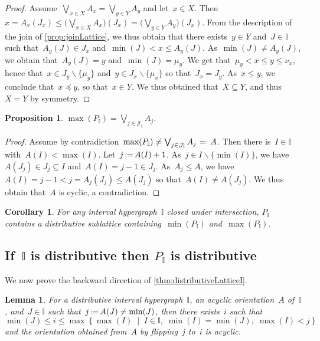 \documentclass[reqno]{amsart}
\newtheorem{corollary}[theorem]{Corollary}
\newtheorem{proposition}[theorem]{Proposition}
\newtheorem{lemma}[theorem]{Lemma}
\theoremstyle{definition}
\newcommand{\cal}[1]{\mathcal{#1}} %
\newcommand{\set}[2]{\left\{ #1 \;\middle|\; #2 \right\}} %
\newcommand{\ssm}{\smallsetminus} %
\newcommand{\eqdef}{\mbox{\,\raisebox{0.2ex}{\scriptsize\ensuremath{\mathrm:}}\ensuremath{=}\,}} %
\newcommand{\defeq}{\mbox{~\ensuremath{=}\raisebox{0.2ex}{\scriptsize\ensuremath{\mathrm:}} }} %
\newcommand{\bigJoin}{\bigvee} %
\newcommand{\II}{\mathbb I} %
\newcommand{\cJ}{\cal{J}} %
\begin{document}
\begin{proof}
Assume~$\bigJoin\limits_{x \in X} A_x = \bigJoin\limits_{y \in Y} A_y$ and let~$x \in X$.
Then $x = A_x(J_x) \le \big( \bigJoin\limits_{x \in X} A_x \big)(J_x) = \big( \bigJoin\limits_{y \in Y} A_y \big)(J_x)$.
From the description of the join of \cref{prop:joinLattice}, we thus obtain that there exists~$y \in Y$ and~$J \in \II$ such that~$A_y(J) \in J_x$ and~$\min(J) < x \le A_y(J)$.
As~$\min(J) \ne A_y(J)$, we obtain that~$A_y(J) = y$ and~$\min(J) = \mu_y$.
We get that~$\mu_y < x \le y \le \nu_x$, hence that~$x \in J_y \ssm \{\mu_y\}$ and~$y \in J_x \ssm \{\mu_x\}$ so that~$J_x = J_y$.
As~$x \le y$, we conclude that~$x \preccurlyeq y$, so that~$x \in Y$.
We thus obtained that~$X \subseteq Y$, and thus~$X = Y$ by symmetry.
\end{proof}

\begin{proposition}
$\displaystyle \max(P_\II) = \bigJoin\limits_{j \in \cJ_\II} A_j$.
\end{proposition}

\begin{proof}
Assume by contradiction~$\max(P_\II) \ne \bigJoin_{j \in \cJ_\II} A_j \defeq A$.
Then there is~$I \in \II$ with~${A(I) < \max(I)}$.
Let~$j \eqdef A(I) + 1$.
As~$j \in I \ssm \{\min(I)\}$, we have~$A(J_j) \in J_j \subseteq I$ and~$A(I) = j-1 \in J_j$.
As~$A_j \le A$, we have~$A(I) = j-1 < j = A_j(J_j) \le A(J_j)$ so that~$A(I) \ne A(J_j)$.
We thus obtain that~$A$ is cyclic, a contradiction.
\end{proof}

\begin{corollary}
For any interval hypergraph~$\II$ closed under intersection, $P_\II$ contains a distributive sublattice containing~$\min(P_\II)$ and~$\max(P_\II)$.
\end{corollary}


\subsection{If~$\II$ is distributive then $P_\II$ is distributive}
\label{subsec:distributiveLatticeBackward}

We now prove the backward direction of \cref{thm:distributiveLatticeI}.

\begin{lemma}
\label{lem:alwaysFlippable}
For a distributive interval hypergraph~$\II$, an acyclic orientation~$A$ of~$\II$, and~$J \in \II$ such that~$j \eqdef A(J) \ne \min(J)$, then there exists~$i$ such that
\[
\min(J) \le i \le \max\set{\max(I)}{I \in \II, \; \min(I) = \min(J), \; \max(I) < j}
\]
and the orientation obtained from~$A$ by flipping~$j$ to~$i$ is acyclic.
\end{lemma}
\end{document}
